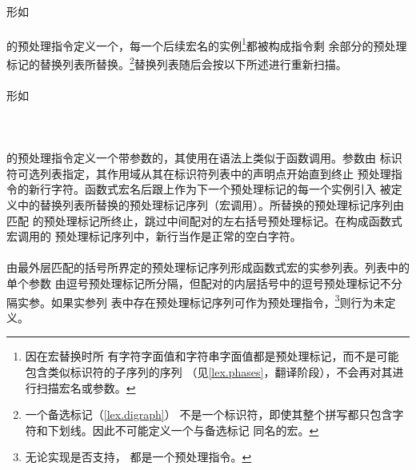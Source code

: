 \paragraph{}
形如                                                                          \\
\mbox{}       \\
的预处理指令定义一个，每一个后续宏名的实例\footnote{因在宏替换时所
有字符字面值和字符串字面值都是预处理标记，而不是可能包含类似标识符的子序列的序列
（见\ref{lex.phases}，翻译阶段），不会再对其进行扫描宏名或参数。}都被构成指令剩
余部分的预处理标记的替换列表所替换。\footnote{一个备选标记（\ref{lex.digraph}）
不是一个标识符，即使其整个拼写都只包含字符和下划线。因此不可能定义一个与备选标记
同名的宏。}替换列表随后会按以下所述进行重新扫描。

\paragraph{}
形如                                                                          \\
\mbox{}                                     \\
\mbox{}                                            \\
\mbox{}                               \\
的预处理指令定义一个带参数的，其使用在语法上类似于函数调用。参数由
标识符可选列表指定，其作用域从其在标识符列表中的声明点开始直到终止
预处理指令的新行字符。函数式宏名后跟上\tm{(}作为下一个预处理标记的每一个实例引入
被定义中的替换列表所替换的预处理标记序列（宏调用）。所替换的预处理标记序列由匹配
的\tm{)}预处理标记所终止，跳过中间配对的左右括号预处理标记。在构成函数式宏调用的
预处理标记序列中，新行当作是正常的空白字符。

\paragraph{}
由最外层匹配的括号所界定的预处理标记序列形成函数式宏的实参列表。列表中的单个参数
由逗号预处理标记所分隔，但配对的内层括号中的逗号预处理标记不分隔实参。如果实参列
表中存在预处理标记序列可作为预处理指令，\footnote{无论实现是否支持，
都是一个预处理指令。}则行为未定义。

